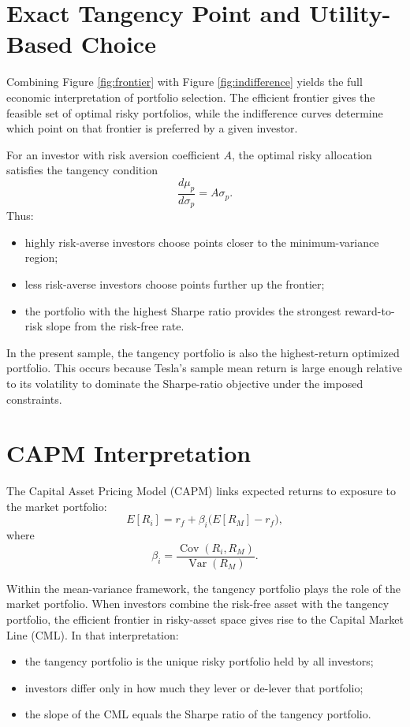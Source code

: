 \documentclass[wcp]{jmlr}
\begin{document}
\begin{abstract - TEST}
\section{Exact Tangency Point and Utility-Based Choice}

Combining Figure \ref{fig:frontier} with Figure \ref{fig:indifference} yields the full economic interpretation of portfolio selection. The efficient frontier gives the feasible set of optimal risky portfolios, while the indifference curves determine which point on that frontier is preferred by a given investor.

For an investor with risk aversion coefficient $A$, the optimal risky allocation satisfies the tangency condition
\begin{equation}
\frac{d\mu_p}{d\sigma_p} = A \sigma_p.
\end{equation}
Thus:
\begin{itemize}
\item highly risk-averse investors choose points closer to the minimum-variance region;
\item less risk-averse investors choose points further up the frontier;
\item the portfolio with the highest Sharpe ratio provides the strongest reward-to-risk slope from the risk-free rate.
\end{itemize}

In the present sample, the tangency portfolio is also the highest-return optimized portfolio. This occurs because Tesla’s sample mean return is large enough relative to its volatility to dominate the Sharpe-ratio objective under the imposed constraints.

\section{CAPM Interpretation}

The Capital Asset Pricing Model (CAPM) links expected returns to exposure to the market portfolio:
\begin{equation}
E[R_i] = r_f + \beta_i \big(E[R_M] - r_f\big),
\end{equation}
where
\begin{equation}
\beta_i = \frac{\operatorname{Cov}(R_i, R_M)}{\operatorname{Var}(R_M)}.
\end{equation}

Within the mean-variance framework, the tangency portfolio plays the role of the market portfolio. When investors combine the risk-free asset with the tangency portfolio, the efficient frontier in risky-asset space gives rise to the Capital Market Line (CML). In that interpretation:
\begin{itemize}
\item the tangency portfolio is the unique risky portfolio held by all investors;
\item investors differ only in how much they lever or de-lever that portfolio;
\item the slope of the CML equals the Sharpe ratio of the tangency portfolio.
\end{itemize}


\end{abstract - TEST}
\end{document}
